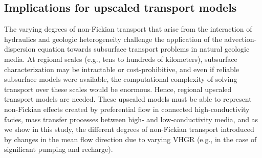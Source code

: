 


%
%
\subsection{Implications for upscaled transport models}
\label{ss_4_3}

The varying degrees of non-Fickian transport that arise from the interaction of hydraulics and geologic heterogeneity challenge the application of the advection-dispersion equation towards subsurface transport problems in natural geologic media. At regional scales (e.g., tens to hundreds of kilometers), subsurface characterization may be intractable or cost-prohibitive, and even if reliable subsurface models were available, the computational complexity of solving transport over these scales would be enormous. Hence, regional upscaled transport models are needed. These upscaled models must be able to represent non-Fickian effects created by preferential flow in connected high‐conductivity facies, mass transfer processes between high‐ and low‐conductivity media, and as we show in this study, the different degrees of non-Fickian transport introduced by changes in the mean flow direction due to varying VHGR (e.g., in the case of significant pumping and recharge).

